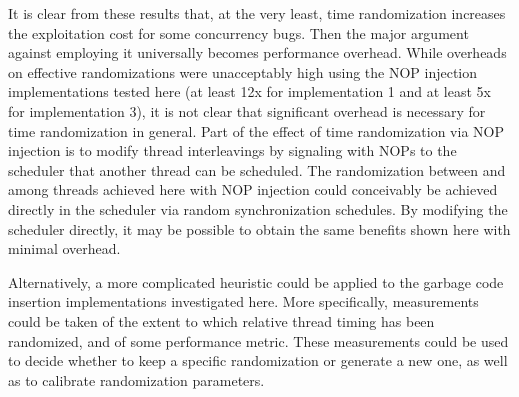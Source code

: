It is clear from these results that, at the very least, time randomization increases the exploitation cost for some concurrency bugs.
Then the major argument against employing it universally becomes performance overhead.
While overheads on effective randomizations were unacceptably high using the NOP injection implementations tested here (at least 12x for implementation 1 and at least 5x for implementation 3), it is not clear that significant overhead is necessary for time randomization in general.
Part of the effect of time randomization via NOP injection is to modify thread interleavings by signaling with NOPs to the scheduler that another thread can be scheduled.
The randomization between and among threads achieved here with NOP injection could conceivably be achieved directly in the scheduler via random synchronization schedules.
By modifying the scheduler directly, it may be possible to obtain the same benefits shown here with minimal overhead.

Alternatively, a more complicated heuristic could be applied to the garbage code insertion implementations investigated here.
More specifically, measurements could be taken of the extent to which relative thread timing has been randomized, and of some performance metric.
These measurements could be used to decide whether to keep a specific randomization or generate a new one, as well as to calibrate randomization parameters.